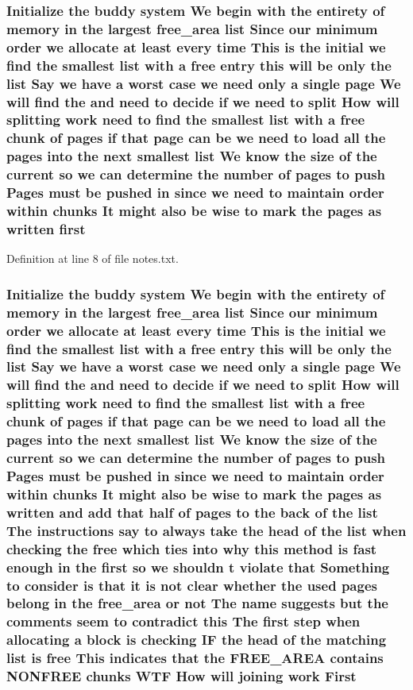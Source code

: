 \subsubsection[{\texorpdfstring{first}{first}}]{\setlength{\rightskip}{0pt plus 5cm}Initialize the buddy system We begin with the entirety of memory {\bf in} the largest {\bf free\+\_\+area} {\bf list} Since our minimum {\bf order} we allocate at least every time This {\bf is} the initial we find the smallest {\bf list} with a free entry this will be only the {\bf list} Say we have a worst case we need only a single {\bf page} We will find the and need to decide if we need to {\bf split} How will splitting work need to find the smallest {\bf list} with a free {\bf chunk} of {\bf pages} if that {\bf page} can be we need to load all the {\bf pages} into the next smallest {\bf list} We know the size of the current {\bf so} we can determine the number of {\bf pages} to push Pages must be pushed {\bf in} since we need to maintain {\bf order} within chunks It might also be wise to mark the {\bf pages} as written first}\hypertarget{notes_8txt_accf77c448218df9fd25c4423d2869fba}{}\label{notes_8txt_accf77c448218df9fd25c4423d2869fba}


Definition at line 8 of file notes.\+txt.

\subsubsection[{\texorpdfstring{First}{First}}]{\setlength{\rightskip}{0pt plus 5cm}Initialize the buddy system We begin with the entirety of memory {\bf in} the largest {\bf free\+\_\+area} {\bf list} Since our minimum {\bf order} we allocate at least every time This {\bf is} the initial we find the smallest {\bf list} with a free entry this will be only the {\bf list} Say we have a worst case we need only a single {\bf page} We will find the and need to decide if we need to {\bf split} How will splitting work need to find the smallest {\bf list} with a free {\bf chunk} of {\bf pages} if that {\bf page} can be we need to load all the {\bf pages} into the next smallest {\bf list} We know the size of the current {\bf so} we can determine the number of {\bf pages} to push Pages must be pushed {\bf in} since we need to maintain {\bf order} within chunks It might also be wise to mark the {\bf pages} as written and add that half of {\bf pages} to the back of the {\bf list} The instructions say to always take the head of the {\bf list} when checking the free which ties into why this method {\bf is} fast enough {\bf in} the {\bf first} {\bf so} we shouldn t violate that Something to consider {\bf is} that {\bf it} {\bf is} {\bf not} clear whether the used {\bf pages} belong {\bf in} the {\bf free\+\_\+area} or {\bf not} The name suggests but the comments seem to contradict this The {\bf first} step when allocating a block {\bf is} checking IF the head of the matching {\bf list} {\bf is} free This indicates that the F\+R\+E\+E\+\_\+\+A\+R\+EA contains N\+O\+N\+F\+R\+EE chunks W\+TF How will joining work First}\hypertarget{notes_8txt_a44e446e457f5bbf4681104b47dacf206}{}\label{notes_8txt_a44e446e457f5bbf4681104b47dacf206}


